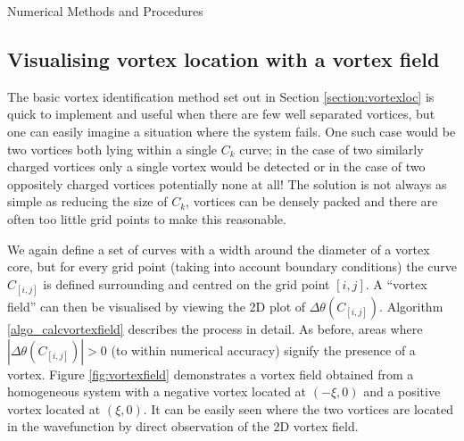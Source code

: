 \begin{chapter}{\label{cha:numerics}Numerical Methods and Procedures}
\subsection{\label{section:vortexfield} Visualising vortex location with a vortex field}
The basic vortex identification method set out in Section \ref{section:vortexloc} is quick to implement and useful when there are few well separated vortices, but one can easily imagine a situation where the system fails. One such case would be two vortices both lying within a single $C_k$ curve; in the case of two similarly charged vortices only a single vortex would be detected or in the case of two oppositely charged vortices potentially none at all! The solution is not always as simple as reducing the size of $C_k$, vortices can be densely packed and there are often too little grid points to make this reasonable.

We again define a set of curves with a width around the diameter of a vortex core, but for every grid point (taking into account boundary conditions) the curve $C_{[i,j]}$ is defined surrounding and centred on the grid point $[i,j]$. A ``vortex field'' can then be visualised by viewing the 2D plot of $\Delta\theta(C_{[i,j]})$. Algorithm \ref{algo_calcvortexfield} describes the process in detail. As before, areas where $|\Delta\theta(C_{[i,j]})| > 0$ (to within numerical accuracy) signify the presence of a vortex. Figure \ref{fig:vortexfield} demonstrates a vortex field obtained from a homogeneous system with a negative vortex located at $(-\xi,0)$ and a positive vortex located at $(\xi,0)$. It can be easily seen where the two vortices are located in the wavefunction by direct observation of the 2D vortex field.
\begin{figure}
  \centering
\end{figure}
\end{chapter}
